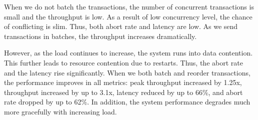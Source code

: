 	
When we do not batch the transactions, the number of concurrent transactions is small and the throughput is low. As a result of low concurrency level, the chance of conflicting is slim. Thus, both abort rate and latency are low. As we send transactions in batches, the throughput increases dramatically. 

However, as the load continues to increase, the system runs into data contention. This further leads to resource contention due to restarts. Thus, the abort rate and the latency rise significantly. When we both batch and reorder transactions, the performance improves in all metrics: peak throughput increased by 1.25x, throughput increased by up to 3.1x, latency reduced by up to 66\%, and abort rate dropped by up to 62\%. In addition, the system performance degrades much more gracefully with increasing load.
